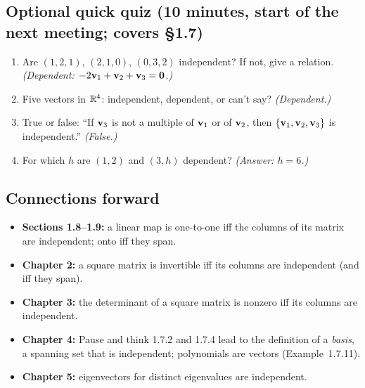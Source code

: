 \documentclass[11pt]{article}
\begin{document}
\subsection*{Optional quick quiz (10 minutes, start of the next meeting; covers \S1.7)}
\begin{enumerate}
 \item Are $(1,2,1)$, $(2,1,0)$, $(0,3,2)$ independent? If not, give a relation. \emph{(Dependent: $-2\mathbf{v}_1+\mathbf{v}_2+\mathbf{v}_3=\mathbf{0}$.)}
 \item Five vectors in $\mathbb{R}^4$: independent, dependent, or can't say? \emph{(Dependent.)}
 \item True or false: ``If $\mathbf{v}_3$ is not a multiple of $\mathbf{v}_1$ or of $\mathbf{v}_2$, then $\{\mathbf{v}_1,\mathbf{v}_2,\mathbf{v}_3\}$ is independent.'' \emph{(False.)}
 \item For which $h$ are $(1,2)$ and $(3,h)$ dependent? \emph{(Answer: $h=6$.)}
\end{enumerate}

\subsection*{Connections forward}
\begin{itemize}
 \item \textbf{Sections 1.8--1.9:} a linear map is one-to-one iff the columns of its matrix are independent; onto iff they span.
 \item \textbf{Chapter 2:} a square matrix is invertible iff its columns are independent (and iff they span).
 \item \textbf{Chapter 3:} the determinant of a square matrix is nonzero iff its columns are independent.
 \item \textbf{Chapter 4:} Pause and think 1.7.2 and 1.7.4 lead to the definition of a \emph{basis}, a spanning set that is independent; polynomials are vectors (Example~1.7.11).
 \item \textbf{Chapter 5:} eigenvectors for distinct eigenvalues are independent.
\end{itemize}
\end{document}
